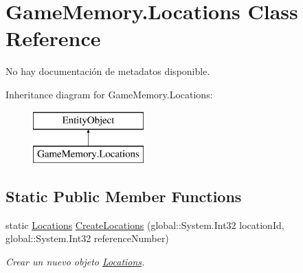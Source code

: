 \hypertarget{class_game_memory_1_1_locations}{\section{Game\-Memory.\-Locations Class Reference}
\label{class_game_memory_1_1_locations}
}


No hay documentación de metadatos disponible.  


Inheritance diagram for Game\-Memory.\-Locations\-:\begin{figure}[H]
\begin{center}
\leavevmode
\includegraphics[height=2.000000cm]{class_game_memory_1_1_locations}
\end{center}
\end{figure}
\subsection*{Static Public Member Functions}
\begin{DoxyCompactItemize}
\item 
static \hyperlink{class_game_memory_1_1_locations}{Locations} \hyperlink{class_game_memory_1_1_locations_a473576211dcf70178087393084d262e1}{Create\-Locations} (global\-::\-System.\-Int32 location\-Id, global\-::\-System.\-Int32 reference\-Number)
\begin{DoxyCompactList}\small\item\em Crear un nuevo objeto \hyperlink{class_game_memory_1_1_locations}{Locations}. \end{DoxyCompactList}\end{DoxyCompactItemize}
